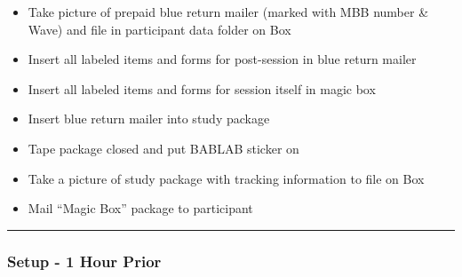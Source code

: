 \documentclass[]{book}
\begin{document}
\begin{itemize}
\item
  Take picture of prepaid blue return mailer (marked with MBB number \& Wave) and file in participant data folder on Box
\item
  Insert all labeled items and forms for post-session in blue return mailer
\item
  Insert all labeled items and forms for session itself in magic box
\item
  Insert blue return mailer into study package
\item
  Tape package closed and put BABLAB sticker on
\item
  Take a picture of study package with tracking information to file on Box
\item
  Mail ``Magic Box'' package to participant
\end{itemize}

\begin{center}\rule{0.5\linewidth}{0.5pt}\end{center}

\hypertarget{setup---1-hour-prior}{%
\subsubsection{Setup - 1 Hour Prior}\label{setup---1-hour-prior}}
\end{document}
